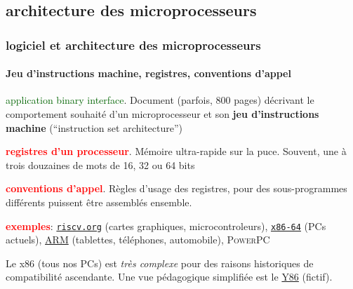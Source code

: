 \documentclass[xcolor=svgnames,final,smaller,a4]{beamer}
\begin{document}
\subsection{architecture des microprocesseurs}
\begin{frame}
  \frametitle{logiciel et architecture des microprocesseurs}
  \framesubtitle{Jeu d'instructions machine, registres, conventions d'appel}

  \textcolor{DarkGreen}{application binary interface}. Document (parfois, 800 pages)
  décrivant le comportement souhaité d'un microprocesseur et son
  \textbf{jeu d'instructions machine} (``instruction set architecture'')

    \vspace{0.3cm}
  \textcolor{red}{\textbf{registres d'un processeur}}. Mémoire
  ultra-rapide sur la puce. Souvent, une à trois douzaines de mots de
 16, 32 ou 64 bits
    \vspace{0.3cm}
    
    \textcolor{red}{\textbf{conventions d'appel}}. Règles d'usage des registres, pour des sous-programmes différents puissent être assemblés ensemble.


    \vspace{0.3cm}
    \textcolor{red}{\textbf{exemples}}: {\large \href{https://riscv.org/}{\texttt{riscv.org}}} (cartes graphiques, microcontroleurs), \href{https://en.wikipedia.org/wiki/X86-64/}{\texttt{x86-64}} (PCs actuels), \href{https://fr.wikipedia.org/wiki/Architecture_ARM}{ARM} (tablettes, téléphones, automobile), \textsc{PowerPC}
    \vspace{0.3cm}
    
    Le x86 (tous nos PCs) est \emph{très complexe} pour des raisons
    historiques de compatibilité ascendante. Une vue pédagogique
    simplifiée est le \href{http://siever.info/cs400/Y86.html}{Y86}
    (fictif).
\end{frame}
\end{document}
